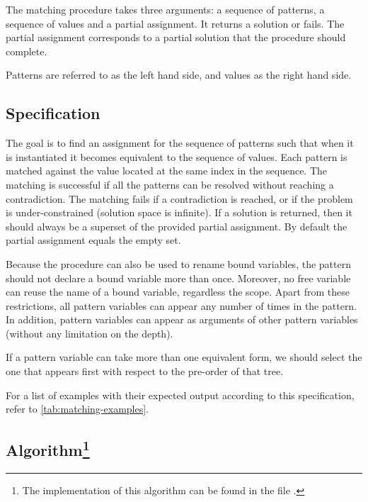 The matching procedure takes three arguments: a sequence of patterns, a sequence of values and a partial assignment. It returns a solution or fails. The partial assignment corresponds to a partial solution that the procedure should complete.

Patterns are referred to as the left hand side, and values as the right hand side.

\subsection{Specification}

The goal is to find an assignment for the sequence of patterns such that when it is instantiated it becomes equivalent to the sequence of values. Each pattern is matched against the value located at the same index in the sequence. The matching is successful if all the patterns can be resolved without reaching a contradiction. The matching fails if a contradiction is reached, or if the problem is under-constrained (solution space is infinite). If a solution is returned, then it should always be a superset of the provided partial assignment. By default the partial assignment equals the empty set.

Because the procedure can also be used to rename bound variables, the pattern should not declare a bound variable more than once. Moreover, no free variable can reuse the name of a bound variable, regardless the scope. Apart from these restrictions, all pattern variables can appear any number of times in the pattern. In addition, pattern variables can appear as arguments of other pattern variables (without any limitation on the depth).

If a pattern variable can take more than one equivalent form, we should select the one that appears first with respect to the pre-order of that tree.

For a list of examples with their expected output according to this specification, refer to \autoref{tab:matching-examples}.

\subsection{Algorithm\texorpdfstring{\footnote{The implementation of this algorithm can be found in the file \href{https://github.com/FlorianCassayre/master-project/blob/master/src/main/scala/me/cassayre/florian/masterproject/front/proof/unification/UnificationUtils.scala}{}.}}{Lg}}


